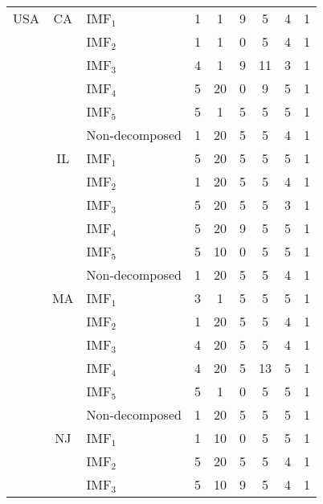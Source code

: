{\begin{longtable}[htb!]{cclc|cc|c|c|c}
USA & {CA} & IMF$_1$        & 1 & 1  & 9 & 5  & 4 & 1 \\
                      &                     & IMF$_2$        & 1 & 1  & 0 & 5  & 4 & 1 \\
                      &                     & IMF$_3$        & 4 & 1  & 9 & 11 & 3 & 1 \\
                      &                     & IMF$_4$        & 5 & 20 & 0 & 9  & 5 & 1 \\
                      &                     & IMF$_5$        & 5 & 1  & 5 & 5  & 5 & 1 \\
                      &                     & Non-decomposed & 1 & 20 & 5 & 5  & 4 & 1 \\ \cline{2-9}
                      & {IL} & IMF$_1$        & 5 & 20 & 5 & 5  & 5 & 1 \\
                      &                     & IMF$_2$        & 1 & 20 & 5 & 5  & 4 & 1 \\
                      &                     & IMF$_3$        & 5 & 20 & 5 & 5  & 3 & 1 \\
                      &                     & IMF$_4$        & 5 & 20 & 9 & 5  & 5 & 1 \\
                      &                     & IMF$_5$        & 5 & 10 & 0 & 5  & 5 & 1 \\
                      &                     & Non-decomposed & 1 & 20 & 5 & 5  & 4 & 1 \\ \cline{2-9}
                      & {MA} & IMF$_1$        & 3 & 1  & 5 & 5  & 5 & 1 \\
                      &                     & IMF$_2$        & 1 & 20 & 5 & 5  & 4 & 1 \\
                      &                     & IMF$_3$        & 4 & 20 & 5 & 5  & 4 & 1 \\
                      &                     & IMF$_4$        & 4 & 20 & 5 & 13 & 5 & 1 \\
                      &                     & IMF$_5$        & 5 & 1  & 0 & 5  & 5 & 1 \\
                      &                     & Non-decomposed & 1 & 20 & 5 & 5  & 5 & 1 \\ \cline{2-9}
                      & {NJ} & IMF$_1$        & 1 & 10 & 0 & 5  & 5 & 1 \\
                      &                     & IMF$_2$        & 5 & 20 & 5 & 5  & 4 & 1 \\
                      &                     & IMF$_3$        & 5 & 10 & 9 & 5  & 4 & 1 \\

\end{longtable}}
